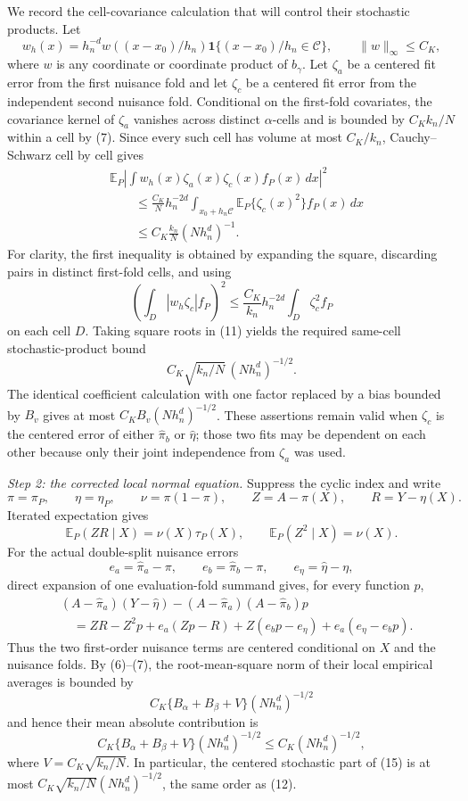 We record the cell-covariance calculation that will control their stochastic
products.  Let
\[
w_h(x)=h_n^{-d}w((x-x_0)/h_n)
\mathbf 1\{(x-x_0)/h_n\in\mathcal C\},
\qquad \|w\|_\infty\le C_K,
\]
where \(w\) is any coordinate or coordinate product of \(b_\gamma\).
Let \(\zeta_a\) be a centered fit error from the first nuisance fold and let
\(\zeta_c\) be a centered fit error from the independent second nuisance
fold.  Conditional on the first-fold covariates, the covariance kernel of
\(\zeta_a\) vanishes across distinct \(\alpha\)-cells and is bounded by
\(C_Kk_n/N\) within a cell by (7).  Since every such cell has volume at most
\(C_K/k_n\), Cauchy--Schwarz cell by cell gives
\[
\begin{aligned}
&\mathbb E_P\left|
\int w_h(x)\zeta_a(x)\zeta_c(x)f_P(x)\,dx
\right|^2\\
&\qquad\le
\frac{C_K}{N}h_n^{-2d}
\int_{x_0+h_n\mathcal C}
\mathbb E_P\{\zeta_c(x)^2\}f_P(x)\,dx\\
&\qquad\le
C_K\frac{k_n}{N}(Nh_n^d)^{-1}.
\end{aligned}
\tag{11}
\]
For clarity, the first inequality is obtained by expanding the square,
discarding pairs in distinct first-fold cells, and using
\[
\left(\int_{D}|w_h\zeta_c|f_P\right)^2
\le \frac{C_K}{k_n}h_n^{-2d}
\int_D\zeta_c^2 f_P
\]
on each cell \(D\).  Taking square roots in (11) yields the required
same-cell stochastic-product bound
\[
C_K\sqrt{k_n/N}\,(Nh_n^d)^{-1/2}.
\tag{12}
\]
The identical coefficient calculation with one factor replaced by a bias
bounded by \(B_v\) gives at most
\(C_KB_v(Nh_n^d)^{-1/2}\).  These assertions remain valid when
\(\zeta_c\) is the centered error of either \(\widehat\pi_b\) or
\(\widehat\eta\); those two fits may be dependent on each other because only
their joint independence from \(\zeta_a\) was used.

\emph{Step 2: the corrected local normal equation.}
Suppress the cyclic index and write
\[
\pi=\pi_P,\qquad
\eta=\eta_P,\qquad
\nu=\pi(1-\pi),\qquad
Z=A-\pi(X),\qquad R=Y-\eta(X).
\]
Iterated expectation gives
\[
\mathbb E_P(ZR\mid X)=\nu(X)\tau_P(X),
\qquad
\mathbb E_P(Z^2\mid X)=\nu(X).
\tag{13}
\]
For the actual double-split nuisance errors
\[
e_a=\widehat\pi_a-\pi,\qquad
e_b=\widehat\pi_b-\pi,\qquad
e_\eta=\widehat\eta-\eta,
\]
direct expansion of one evaluation-fold summand gives, for every function
\(p\),
\[
\begin{aligned}
&(A-\widehat\pi_a)(Y-\widehat\eta)
-(A-\widehat\pi_a)(A-\widehat\pi_b)p\\
&\quad=ZR-Z^2p
+e_a(Zp-R)+Z(e_bp-e_\eta)+e_a(e_\eta-e_bp).
\end{aligned}
\tag{14}
\]
Thus the two first-order nuisance terms are centered conditional on \(X\) and
the nuisance folds.  By (6)--(7), the root-mean-square norm of their local
empirical averages is bounded by
\[
C_K\{B_\alpha+B_\beta+V\}
(Nh_n^d)^{-1/2}
\]
and hence their mean absolute contribution is
\[
C_K\{B_\alpha+B_\beta+V\}(Nh_n^d)^{-1/2}
\le C_K(Nh_n^d)^{-1/2},
\tag{15}
\]
where \(V=C_K\sqrt{k_n/N}\).  In particular, the centered stochastic part
of (15) is at most
\(C_K\sqrt{k_n/N}(Nh_n^d)^{-1/2}\), the same order as (12).

